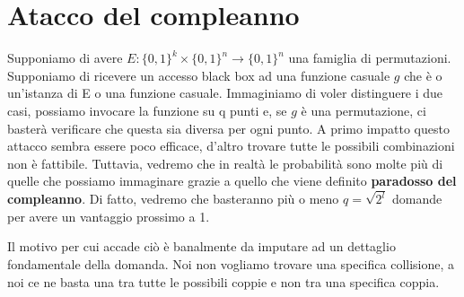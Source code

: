 \section{Atacco del compleanno}
Supponiamo di avere $E:\{0,1\}^k \times \{0,1\}^n \xrightarrow{} \{0,1\}^n$ una famiglia di permutazioni. Supponiamo di ricevere un accesso black box ad una funzione casuale $g$ che è o un'istanza di E o una funzione casuale. 
Immaginiamo di voler distinguere i due casi, possiamo invocare la funzione su q punti e, se $g$ è una permutazione, ci basterà verificare che questa sia diversa per ogni punto. A primo impatto questo attacco sembra essere poco efficace, d'altro trovare tutte le possibili combinazioni non è fattibile. Tuttavia, vedremo che in realtà le probabilità sono molte più di quelle che possiamo immaginare grazie a quello che viene definito \textbf{paradosso del compleanno}. Di fatto, vedremo che basteranno più o meno $q = \sqrt{2^l}$ domande per avere un vantaggio prossimo a 1.

Il motivo per cui accade ciò è banalmente da imputare ad un dettaglio fondamentale della domanda. Noi non vogliamo trovare una specifica collisione, a noi ce ne basta una tra tutte le possibili coppie e non tra una specifica coppia. 

